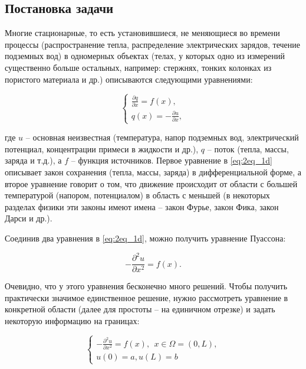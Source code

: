 \documentclass[a4paper, 11pt]{article}
\begin{document}
\subsection{Постановка задачи}

Многие стационарные, то есть установившиеся, не меняющиеся во времени процессы (распространение тепла, распределение электрических зарядов, течение подземных вод) в одномерных объектах (телах, у которых одно из измерений существенно больше остальных, например: стержнях, тонких колонках из пористого материала и др.) описываются следующими уравнениями:

\begin{equation}\label{eq:2eq_1d}
	\begin{cases}
		\frac{\partial q}{\partial x} = f(x),\\
		q(x) = -\frac{\partial u}{\partial x},
	\end{cases}
\end{equation}

где $u$ -- основная неизвестная (температура, напор подземных вод, электрический потенциал, концентрации примеси в жидкости и др.), $q$ --  поток (тепла, массы, заряда и т.д.), а $f$ -- функция источников. Первое уравнение в \eqref{eq:2eq_1d} описывает закон сохранения (тепла, массы, заряда) в дифференциальной форме, а второе уравнение говорит о том, что движение происходит от области с большей температурой (напором, потенциалом) в область с меньшей (в некоторых разделах физики эти законы имеют имена -- закон Фурье, закон Фика, закон Дарси и др.).

Соединив два уравнения в \eqref{eq:2eq_1d}, можно получить уравнение Пуассона:

\begin{equation}
	-\frac{\partial^2 u}{\partial x^2} = f(x).
\end{equation}

Очевидно, что у этого уравнения бесконечно много решений. Чтобы получить практически значимое единственное решение, нужно рассмотреть уравнение в конкретной области (далее для простоты -- на единичном отрезке) и задать некоторую информацию на границах:

\begin{equation}\label{eq:poisson_bvp_dir_1d}
	\begin{cases}
		-\frac{\partial^2 u}{\partial x^2} = f(x),~~x\in\Omega = (0,L),\\
		u(0) = a, u(L) = b
	\end{cases}
\end{equation}
\end{document}
